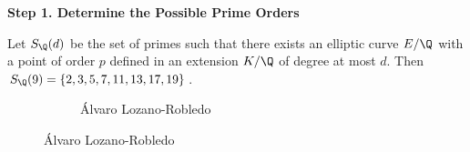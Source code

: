 \begin{frame}[plain]
\vfill
\begin{center} {\bfseries \Large \textcolor{UniOrange}{Step 1. Determine the Possible Prime Orders}} \end{center}
\vfill 
\end{frame}





\begin{frame}[plain,c]
\begin{thm}
Let $S_\Q(d)$ be the set of primes such that there exists an elliptic curve $E/\Q$ with a point of order $p$ defined in an extension $K/\Q$ of degree at most $d$. Then $S_\Q(9)= \{ 2, 3, 5, 7, 11, 13, 17, 19 \}$.
\end{thm}

	\begin{figure}[h]
	\centering
	\begin{subfigure}{\textwidth}
	\captionsetup{labelformat=empty}
	\centering
	\caption{\'Alvaro Lozano-Robledo}
	\end{subfigure}
	\end{figure}
\end{frame}






